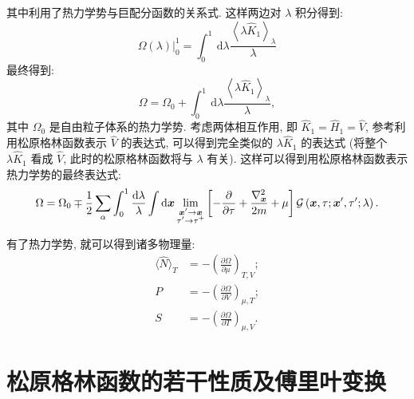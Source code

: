 其中利用了热力学势与巨配分函数的关系式. 这样两边对 $\lambda$ 积分得到:
\begin{equation}
\left.\Omega(\lambda)\right|_0 ^1=\int_0^1 \mathrm{~d} \lambda \frac{\left\langle\lambda \hat{K}_1\right\rangle_\lambda}{\lambda}
\end{equation}
最终得到:
\begin{equation}
\Omega=\Omega_0+\int_0^1 \mathrm{~d} \lambda \frac{\left\langle\lambda \hat{K}_1\right\rangle_\lambda}{\lambda},
\end{equation}
其中 $\Omega_0$ 是自由粒子体系的热力学势. 考虑两体相互作用, 即 $\hat{K}_1=\hat{H}_1=\hat{V}$, 参考利用松原格林函数表示 $\hat{V}$ 的表达式, 可以得到完全类似的 $\lambda \hat{K}_1$ 的表达式 (将整个 $\lambda \hat{K}_1$ 看成 $\hat{V}$, 此时的松原格林函数将与 $\lambda$ 有关). 这样可以得到用松原格林函数表示热力学势的最终表达式:
\begin{equation}
\Omega=\Omega_0 \mp \frac{1}{2}\sum_\alpha\int_0^1 \frac{\mathrm{d} \lambda}{\lambda}   \int \mathrm{d} \boldsymbol{x} \lim _{\substack{\boldsymbol{x}^{\prime} \rightarrow \boldsymbol{x} \\ \tau^{\prime} \rightarrow \tau^{+}}}\left[-\frac{\partial}{\partial \tau}+\frac{\nabla_{\boldsymbol{x}}^2}{2 m}+\mu\right] \mathcal{G}\left(\boldsymbol{x}, \tau ; \boldsymbol{x}^{\prime}, \tau^{\prime} ; \lambda\right) .
\end{equation}

有了热力学势, 就可以得到诸多物理量:
\begin{align}
\langle \hat N \rangle_T &= -\left(\frac{\partial \Omega}{\partial \mu}\right)_{T,V};\\
P &= -\left(\frac{\partial \Omega}{\partial V}\right)_{\mu ,T};\\
S &= -\left(\frac{\partial \Omega}{\partial T}\right)_{\mu ,V}.
\end{align}

\section{松原格林函数的若干性质及傅里叶变换}
